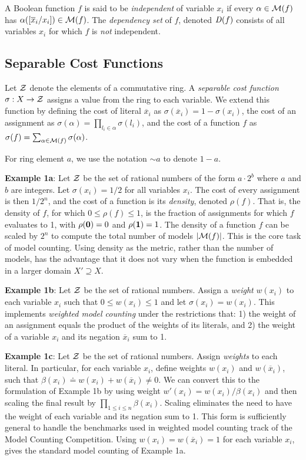\documentclass{llncs}
\newcommand{\one}{\mbox{\bf 1}}
\newcommand{\zero}{\mbox{\bf 0}}
\newcommand{\obar}[1]{\overline{#1}}
\newcommand{\oneminus}{{\sim}}
\newcommand{\interp}{\alpha}
\newcommand{\interpset}[1]{{\cal M}(#1)}
\newcommand{\ring}{{\cal Z}}
\newcommand{\cost}{\sigma}
\newcommand{\density}{\rho}
\newcommand{\depend}{{\it D}}
\newcommand{\subs}[2]{[#2/#1]}
\begin{document}
A Boolean function $f$ is said to be {\em independent} of variable
$x_i$ if every $\interp \in \interpset{f}$ has
$\interp(\subs{x_i}{\obar{x}_i}) \in \interpset{f}$.
The {\em dependency set} of $f$, denoted
$\depend(f)$ consists of all variables $x_i$ for which $f$ is {\em
  not} independent.

\subsection{Separable Cost Functions}

Let $\ring$ denote the elements of a commutative ring.  A {\em
  separable cost function} $\cost:X \rightarrow \ring$ assigns a value
from the ring to each variable.  We extend this function by defining
the cost of literal $\obar{x}_i$ as $\cost(\obar{x}_i) = 1 - \cost(x_i)$, the cost
of an assignment as
$\cost(\interp) = \prod_{l_i \in \interp} \cost(l_i)$,
and the cost of a function $f$ as
$\cost(f) = \sum_{\interp \in \interpset{f}} \cost(\interp)$.

For ring element $a$, we use the notation $\oneminus a$ to denote $1 - a$.

{\bf Example 1a}: Let $\ring$ be the set of rational numbers of the form $a\cdot 2^b$ where $a$ and $b$ are integers.
Let $\cost(x_i) = 1/2$ for all variables $x_i$.  The cost of every
assignment is then $1/2^{n}$, and the cost of a function is its
{\em density}, denoted $\density(f)$.  That is, the density of $f$, for which
$0 \leq \density(f) \leq 1$, 
is the fraction of assignments for which $f$
evaluates to 1, with $\density(\zero) = 0$ and $\density(\one) = 1$.  The density of a function
$f$ can be scaled by $2^n$ to compute the total number of models
$|\interpset{f}|$.  This is the core task of model counting.  Using
density as the metric, rather than the number of models, has the advantage that it does not vary when the
function is embedded in a larger domain $X' \supseteq X$.  

{\bf Example 1b}: Let $\ring$ be the set of rational numbers.  Assign a
{\em weight} $w(x_i)$ to each variable $x_i$ such that
$0 \leq w(x_i) \leq 1$
and let $\cost(x_i) = w(x_i)$.  This implements {\em weighted model counting}
under the restrictions that: 
1) the
weight of an assignment equals the product of the weights of its
literals, and 2) the weight of a variable $x_i$ and its negation
$\obar{x}_i$ sum to 1.

{\bf Example 1c}: Let $\ring$ be the set of rational numbers.  Assign
{\em weights} to each literal.  In particular, for each variable
$x_i$, define weights $w(x_i)$ and $w(\obar{x}_i)$, such that
$\beta(x_i) \doteq w(x_i) + w(\obar{x}_i) \not = 0$.  We can convert
this to the formulation of Example 1b by using weight $w'(x_i) =
w(x_i)/\beta(x_i)$ and then scaling the final result by $\prod_{1 \leq
  i \leq n} \beta(x_i)$.  Scaling eliminates the need to have the weight
of each variable and its negation sum to 1.  This form is sufficiently general
to handle the benchmarks used in weighted model counting track of the Model Counting Competition.
Using $w(x_i) = w(\obar{x}_i) = 1$ for each variable $x_i$,
gives the standard model counting of Example 1a.
\end{document}
